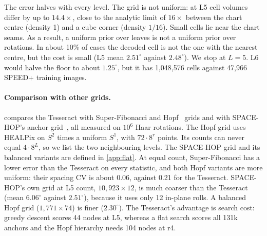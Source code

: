 The error halves with every level. The grid is not uniform: at L5 cell volumes differ by up to $14.4\times$, close to the analytic limit of $16\times$ between the chart centre (density 1) and a cube corner (density $1/16$). Small cells lie near the chart seams. As a result, a uniform prior over leaves is not a uniform prior over rotations. In about 10\% of cases the decoded cell is not the one with the nearest centre, but the cost is small (L5 mean $2.51^\circ$ against $2.48^\circ$). We stop at $L=5$. L6 would halve the floor to about $1.25^\circ$, but it has 1,048,576 cells against 47,966 SPEED+ training images.

\paragraph{Comparison with other grids.}
 compares the Tesseract with Super-Fibonacci and Hopf~\cite{yershova2010hopf} grids and with SPACE-HOP's anchor grid~\cite{dutta2026spacehop}, all measured on $10^6$ Haar rotations. The Hopf grid uses HEALPix on $S^2$ times a uniform $S^1$, with $72\cdot8^r$ points. Its counts can never equal $4\cdot8^L$, so we list the two neighbouring levels. The SPACE-HOP grid and its balanced variants are defined in \cref{app:flat}. At equal count, Super-Fibonacci has a lower error than the Tesseract on every statistic, and both Hopf variants are more uniform: their spacing CV is about 0.06, against 0.21 for the Tesseract. SPACE-HOP's own grid at L5 count, $10{,}923\times12$, is much coarser than the Tesseract (mean $6.06^\circ$ against $2.51^\circ$), because it uses only 12 in-plane rolls. A balanced Hopf grid ($1{,}771\times74$) is finer ($2.30^\circ$). The Tesseract's advantage is search cost: greedy descent scores 44 nodes at L5, whereas a flat search scores all 131k anchors and the Hopf hierarchy needs 104 nodes at r4.

